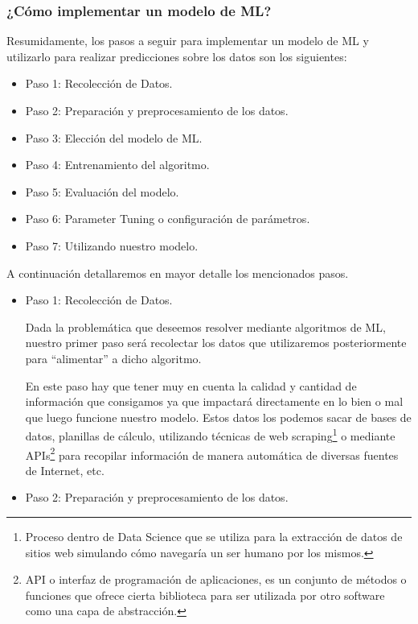 \documentclass[12pt,a4paper]{article}
\begin{document}
\begin{sloppypar}
\cleardoublepage
\subsubsection{¿Cómo implementar un modelo de ML?}

Resumidamente, los pasos a seguir para implementar un modelo de ML y utilizarlo para realizar predicciones sobre los datos son los siguientes:
\begin{itemize}
\item Paso 1: Recolección de Datos.
\item Paso 2: Preparación y preprocesamiento de los datos.
\item Paso 3: Elección del modelo de ML.
\item Paso 4: Entrenamiento del algoritmo.
\item Paso 5: Evaluación del modelo.
\item Paso 6: Parameter Tuning o configuración de parámetros.
\item Paso 7: Utilizando nuestro modelo.\\
\end{itemize}

A continuación detallaremos en mayor detalle los mencionados pasos.

\begin{itemize}
\item Paso 1: Recolección de Datos.

Dada la problemática que deseemos resolver mediante algoritmos de ML, nuestro primer paso será recolectar los datos que utilizaremos posteriormente para “alimentar” a dicho algoritmo. 

En este paso hay que tener muy en cuenta la calidad y cantidad de información que consigamos ya que impactará directamente en lo bien o mal que luego funcione nuestro modelo. Estos datos los podemos sacar de bases de datos, planillas de cálculo, utilizando técnicas de web scraping\footnote{Proceso dentro de Data Science que se utiliza para la extracción de datos de sitios web simulando cómo navegaría un ser humano por los mismos.} o mediante APIs\footnote{API o interfaz de programación de aplicaciones, es un conjunto de métodos o funciones que ofrece cierta biblioteca para ser utilizada por otro software como una capa de abstracción.} para recopilar información de manera automática de diversas fuentes de Internet, etc.\\

\item Paso 2: Preparación y preprocesamiento de los datos.


\end{itemize}
\end{sloppypar}
\end{document}

